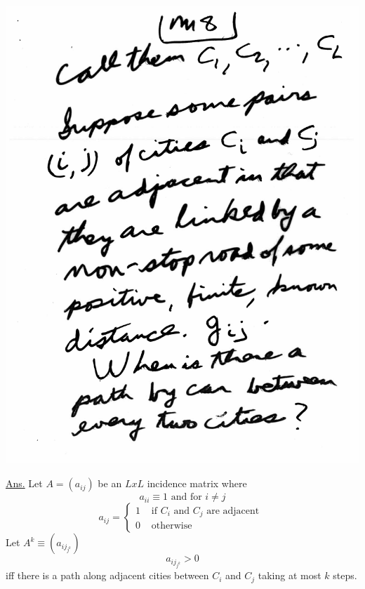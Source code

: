 \documentclass[10pt,a4paper]{article}
\begin{document}
\includegraphics[scale=.5]{Pages/MS_8}

\newpage

\underline{Ans.} \newline
Let $A = (a_{ij} )$ be an $L x L$ incidence matrix where $$ a_{ii} \equiv 1  \mbox{ and for } i \neq j$$ 
$$a_{ij} = 
\begin{cases} 
1 & \mbox{ if } C_i \mbox{ and } C_j \mbox{ are adjacent } \\ 
0 & \mbox{ otherwise }
\end{cases}$$ \newline
Let $A^k \equiv (a_{ij_{j^k}})$ $$a_{ij_{j^k}} > 0$$ iff there is a path along adjacent cities between $C_i$ and $C_j$ taking at most $k$ steps. 
\end{document}
